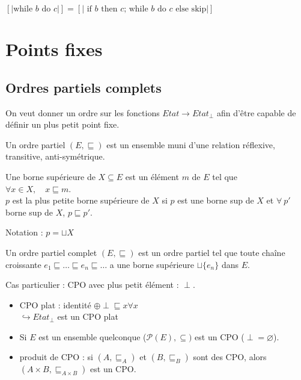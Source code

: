 \documentclass[10pt,a4paper]{article}
\newcommand{\semm}[1]{\left[| #1 | \right]}
\begin{document}
\begin{prop}
$ \semm{\text{while }b\text{ do }c} = \semm{\text{ if $b$ then $c$; while $b$ do $c$ else skip}}$
\end{prop}


\section{Points fixes}

\subsection{Ordres partiels complets}
On veut donner un ordre sur les fonctions $Etat \rightarrow Etat_{\perp}$ afin d'être capable de définir un plus petit point fixe.
\begin{definition}
 Un ordre partiel $(E,\sqsubseteq)$ est un ensemble muni d'une relation réflexive, transitive, anti-symétrique.
\end{definition}
\begin{definition}
 Une borne supérieure de $X \subseteq E$ est un élément $m$ de $E$ tel que \\
\indent $\forall x \in X, \quad x \sqsubseteq m$.\\
$p$ est la plus petite borne supérieure de $X$ si $p$ est une borne sup de $X$ et $\forall \: p'$ borne sup de $X$, $p \sqsubseteq p'$.

Notation : $p = \sqcup X$
\end{definition}
\begin{definition}
 Un ordre partiel complet $(E,\sqsubseteq)$ est un ordre partiel tel que toute chaîne croissante $e_1 \sqsubseteq \dots \sqsubseteq e_n \sqsubseteq \dots $ a une borne supérieure $\sqcup \{ e_n \}$ dans $E$.

 Cas particulier : CPO avec plus petit élément : $\perp$.
\end{definition}
\begin{exs}[de CPO :]
 \begin{itemize}
  \item CPO plat : identité $\oplus \perp \sqsubseteq x \forall x$ 
  \\ $\hookrightarrow Etat_{\perp}$ est un CPO plat
  \item Si $E$ est un ensemble quelconque ($\mathcal{P}(E), \subseteq)$ est un CPO ($\perp = \varnothing $).
  \item produit de CPO : si $(A, \sqsubseteq_A)$ et $(B, \sqsubseteq_B)$ sont des CPO, alors $(A\times B, \sqsubseteq_{A\times B})$ est un CPO.
 \end{itemize}

\end{exs}
\end{document}
